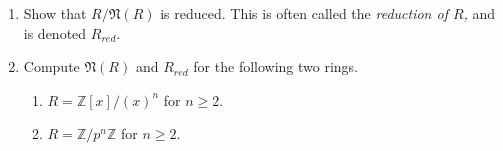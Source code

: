 \documentclass[11pt]{article}
\newcommand{\bZ}{\mathbb{Z}}
\newcommand{\fN}{\mathfrak{N}}
\begin{document}
\begin{enumerate}
{  \begin{enumerate}
    \item{Show that $R/\fN(R)$ is reduced.  This is often called the \textit{reduction of $R$,} and is denoted $R_{red}$.}
    \item{Compute $\fN(R)$ and $R_{red}$ for the following two rings.
    \begin{enumerate}
    \item $R = \bZ[x]/(x)^n$ for $n\ge2$.
    \item $R = \bZ/p^n\bZ$ for $n\ge2$.
    \end{enumerate}}
  \end{enumerate}
  }

\end{enumerate}
\end{document}
